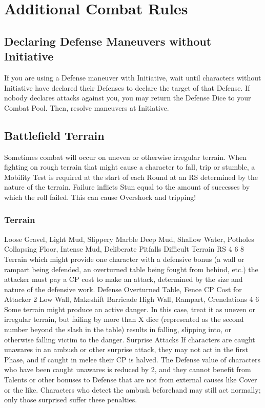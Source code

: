 \documentclass[oneside,11pt,english]{book}
\begin{document}
\section{Additional Combat Rules}
\subsection{Declaring Defense Maneuvers without Initiative}
If you are using a Defense maneuver with Initiative, wait until characters without Initiative have declared
their Defenses to declare the target of that Defense. If nobody declares attacks against you, you may
return the Defense Dice to your Combat Pool. Then, resolve maneuvers at Initiative.
\subsection{Battlefield Terrain}
Sometimes combat will occur on uneven or otherwise irregular terrain. When fighting on rough terrain
that might cause a character to fall, trip or stumble, a Mobility Test is required at the start of each Round
at an RS determined by the nature of the terrain. Failure inflicts Stun equal to the amount of successes by
which the roll failed. This can cause Overshock and tripping!
\subsubsection{Terrain} %
Loose Gravel, Light Mud, Slippery Marble
Deep Mud, Shallow Water, Potholes
Collapsing Floor, Intense Mud, Deliberate Pitfalls
Difficult Terrain RS
4
6
8
Terrain which might provide one character with a defensive bonus (a wall or rampart being defended, an
overturned table being fought from behind, etc.) the attacker must pay a CP cost to make an attack,
determined by the size and nature of the defensive work.
Defense
Overturned Table, Fence
CP Cost for Attacker
2
Low Wall, Makeshift Barricade
High Wall, Rampart, Crenelations
4
6
Some terrain might produce an active danger. In this case, treat it as uneven or irregular terrain, but failing
by more than X dice (represented as the second number beyond the slash in the table) results in falling,
slipping into, or otherwise falling victim to the danger.
Surprise Attacks
If characters are caught unawares in an ambush or other surprise attack, they may not act in the first
Phase, and if caught in melee their CP is halved. The Defense value of characters who have been caught
unawares is reduced by 2, and they cannot benefit from Talents or other bonuses to Defense that are not
from external causes like Cover or the like.
Characters who detect the ambush beforehand may still act normally; only those surprised suffer these
penalties.
\end{document}
